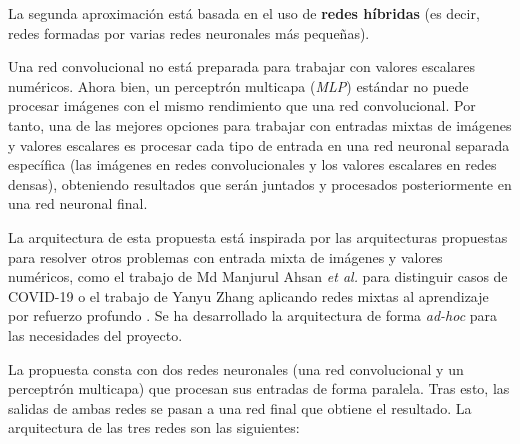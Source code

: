 La segunda aproximación está basada en el uso de \textbf{redes híbridas} (es decir, redes formadas por varias redes neuronales más pequeñas).

Una red convolucional no está preparada para trabajar con valores escalares numéricos. Ahora bien, un perceptrón multicapa (\textit{MLP}) estándar no puede procesar imágenes con el mismo rendimiento que una red convolucional. Por tanto, una de las mejores opciones para trabajar con entradas mixtas de imágenes y valores escalares es procesar cada tipo de entrada en una red neuronal separada específica (las imágenes en redes convolucionales y los valores escalares en redes densas), obteniendo resultados que serán juntados y procesados posteriormente en una red neuronal final.

La arquitectura de esta propuesta está inspirada por las arquitecturas propuestas para resolver otros problemas con entrada mixta de imágenes y valores numéricos, como el trabajo de Md Manjurul Ahsan \textit{et al.}  para distinguir casos de COVID-19 \cite{sym12091526} o el trabajo de Yanyu Zhang aplicando redes mixtas al aprendizaje por refuerzo profundo \cite{DBLP:journals/corr/abs-2010-00717}. Se ha desarrollado la arquitectura de forma \textit{ad-hoc} para las necesidades del proyecto.

La propuesta consta con dos redes neuronales (una red convolucional y un perceptrón multicapa) que procesan sus entradas de forma paralela. Tras esto, las salidas de ambas redes se pasan a una red final que obtiene el resultado. La arquitectura de las tres redes son las siguientes:

